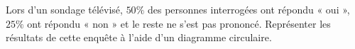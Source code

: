 
\begin{exercice}\label{exo2smath-0303}

Lors d'un sondage télévisé, \( 50\%\) des personnes interrogées ont répondu « oui », $25\%$ ont répondu « non » et le reste ne s'est pas prononcé.  Représenter les résultats de cette enquête à l'aide d'un diagramme circulaire.

\end{exercice}
